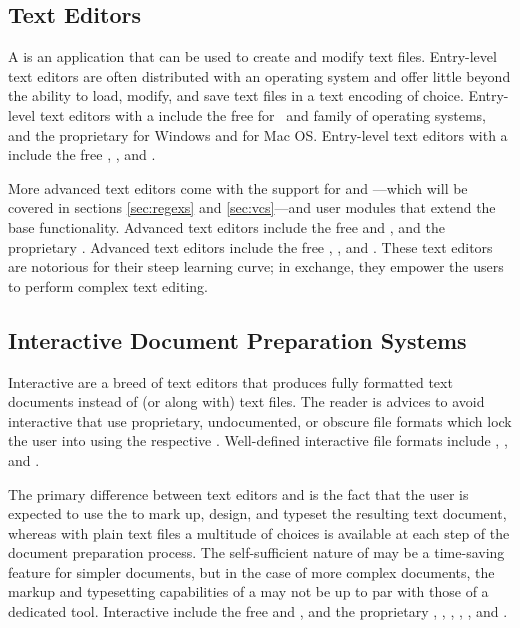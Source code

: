 \subsection{Text Editors}
A  is an application that can be used to create and modify
text files. Entry-level text editors are often distributed with an operating
system and offer little beyond the ability to load, modify, and save text files
in a text encoding of choice. Entry-level text editors with a 
include the free  for \Linux\ and  family of operating
systems, and the proprietary  for Windows and  for
Mac OS. Entry-level text editors with a  include the free
, 
, and .

More advanced text editors come with the support for 
and ---which will be covered in sections \ref{sec:regexs}
and \ref{sec:vcs}---and user modules that extend the base functionality.
Advanced  text editors include the free  and
, and the proprietary .  Advanced  text
editors include the free , , and . These
 text editors are notorious for their steep learning curve; in
exchange, they empower the users to perform complex text editing.

\subsection{Interactive Document Preparation Systems}
Interactive  are a breed of text
editors that produces fully formatted text documents instead of (or along with)
text files. The reader is advices to avoid interactive  that use
proprietary, undocumented, or obscure file formats which lock the user into
using the respective . Well-defined interactive  file
formats include , , and .

The primary difference between text editors and  is the fact that
the user is expected to use the  to mark up, design, and typeset the
resulting text document, whereas with plain text files a multitude of choices is
available at each step of the document preparation process. The self-sufficient
nature of  may be a time-saving feature for simpler documents, but
in the case of more complex documents, the markup and typesetting capabilities
of a  may not be up to par with those of a dedicated tool.
Interactive  include the free  and
, and the proprietary , ,
, , , and
.


